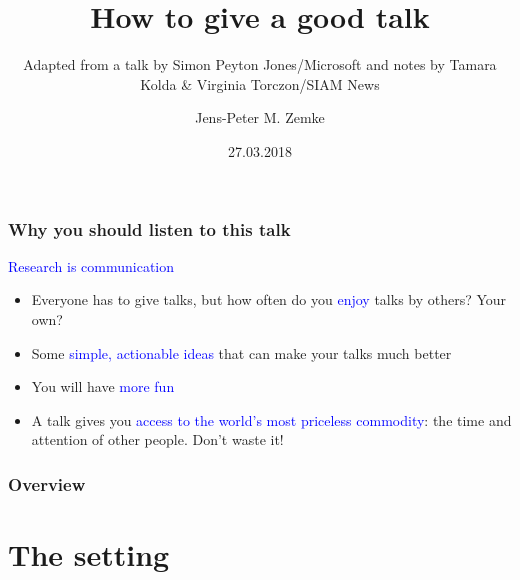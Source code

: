 \documentclass[aspectratio=43,10pt,ucs]{beamer} %
\title{How to give a good talk}
\subtitle{Adapted from a talk by Simon Peyton Jones/Microsoft and
  notes by Tamara Kolda \& Virginia Torczon/SIAM News}
\author[Jens-Peter M. Zemke]{%
  Jens-Peter M. Zemke}
\institute{\href{http://www.tu-harburg.de/mat/}{%
              Institut für Mathematik}\\
            Lehrstuhl Numerische Mathematik\\
           \href{http://www.tu-harburg.de/}{%
            Technische Universität Hamburg}}
\date{27.03.2018}
\begin{document}
\begin{frame}
  \titlepage
\end{frame}
\begin{frame}
  \frametitle{Why you should listen to this talk}

  \textcolor{blue}{Research is communication}

  \vspace*{1em}

  \begin{itemize}
  \item Everyone has to give talks, but how often do you
    \textcolor{blue}{enjoy} talks by others? Your own?
  \item Some \textcolor{blue}{simple, actionable ideas} that can make
    your talks much better
  \item You will have \textcolor{blue}{more fun}
  \item A talk gives you \textcolor{blue}{access to the world's most
      priceless commodity}: the time and attention of other
    people. \alert{Don't waste it!}
  \end{itemize}


\end{frame}
\begin{frame}
  \frametitle{Overview
      }
  \tableofcontents
\end{frame}
\section{The setting}
\end{document}
